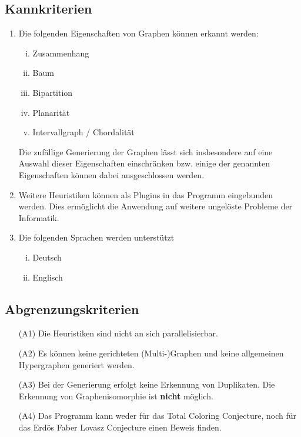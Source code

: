 \documentclass{article}
\begin{document}
	\subsection{Kannkriterien}
	\begin{enumerate}[(K1)]
		\item{Die folgenden Eigenschaften von Graphen können erkannt werden:
			\begin{enumerate}[i)]
				\item{Zusammenhang}
				\item{Baum}
				\item{Bipartition}
				\item{Planarität}
				\item{Intervallgraph / Chordalität}
			\end{enumerate}
			Die zufällige Generierung der Graphen lässt sich insbesondere auf eine Auswahl dieser Eigenschaften einschränken bzw. einige der genannten Eigenschaften können dabei ausgeschlossen werden.
		}
		\item{Weitere Heuristiken können als Plugins in das Programm eingebunden werden. Dies ermöglicht die Anwendung auf weitere ungelöste Probleme der Informatik.}
		\item{Die folgenden Sprachen werden unterstützt
			\begin{enumerate}[i)]
				\item{Deutsch}
				\item{Englisch}
			\end{enumerate}
		}
	\end{enumerate}
	
	\subsection{Abgrenzungskriterien}
	\begin{enumerate}
		\item[(A1)]{Die Heuristiken sind nicht an sich parallelisierbar.}
		\item[(A2)]{Es können keine gerichteten (Multi-)Graphen und keine allgemeinen Hypergraphen generiert werden.}
		\item[(A3)]{Bei der Generierung erfolgt keine Erkennung von Duplikaten. Die Erkennung von Graphenisomorphie ist \textbf{nicht} möglich.}
		\item[(A4)]{Das Programm kann weder für das Total Coloring Conjecture, noch für das Erdös Faber Lovasz Conjecture einen Beweis finden.}
	\end{enumerate}
	
\end{document}
